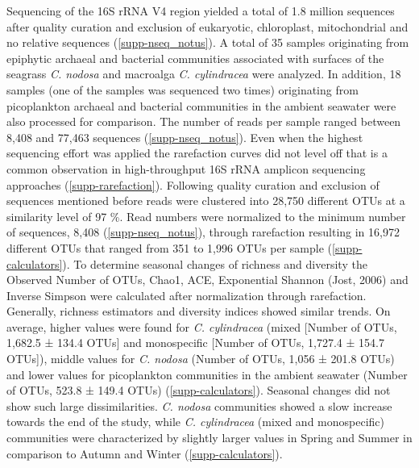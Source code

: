 \documentclass[12pt,]{article}
\begin{document}
Sequencing of the 16S rRNA V4 region yielded a total of 1.8 million
sequences after quality curation and exclusion of eukaryotic,
chloroplast, mitochondrial and no relative sequences
(\autoref{supp-nseq_notus}). A total of 35 samples originating from
epiphytic archaeal and bacterial communities associated with surfaces of
the seagrass \emph{C. nodosa} and macroalga \emph{C. cylindracea} were
analyzed. In addition, 18 samples (one of the samples was sequenced two
times) originating from picoplankton archaeal and bacterial communities
in the ambient seawater were also processed for comparison. The number
of reads per sample ranged between 8,408 and 77,463 sequences
(\autoref{supp-nseq_notus}). Even when the highest sequencing effort was
applied the rarefaction curves did not level off that is a common
observation in high-throughput 16S rRNA amplicon sequencing approaches
(\autoref{supp-rarefaction}). Following quality curation and exclusion
of sequences mentioned before reads were clustered into 28,750 different
OTUs at a similarity level of 97 \si{\percent}. Read numbers were
normalized to the minimum number of sequences, 8,408
(\autoref{supp-nseq_notus}), through rarefaction resulting in 16,972
different OTUs that ranged from 351 to 1,996 OTUs per sample
(\autoref{supp-calculators}). To determine seasonal changes of richness
and diversity the Observed Number of OTUs, Chao1, ACE, Exponential
Shannon (Jost, 2006) and Inverse Simpson were calculated after
normalization through rarefaction. Generally, richness estimators and
diversity indices showed similar trends. On average, higher values were
found for \emph{C. cylindracea} (mixed {[}Number of OTUs, 1,682.5 ±
134.4 OTUs{]} and monospecific {[}Number of OTUs, 1,727.4 ± 154.7
OTUs{]}), middle values for \emph{C. nodosa} (Number of OTUs, 1,056 ±
201.8 OTUs) and lower values for picoplankton communities in the ambient
seawater (Number of OTUs, 523.8 ± 149.4 OTUs)
(\autoref{supp-calculators}). Seasonal changes did not show such large
dissimilarities. \emph{C. nodosa} communities showed a slow increase
towards the end of the study, while \emph{C. cylindracea} (mixed and
monospecific) communities were characterized by slightly larger values
in Spring and Summer in comparison to Autumn and Winter
(\autoref{supp-calculators}).
\end{document}
